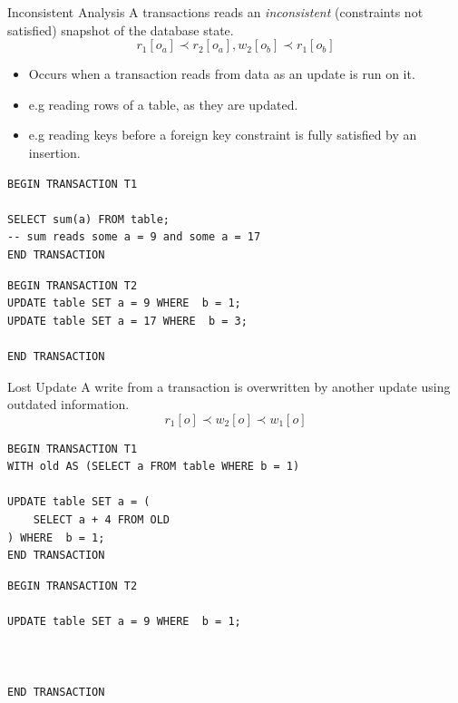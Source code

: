 \begin{definitionbox}{Inconsistent Analysis}
    A transactions reads an \textit{inconsistent} (constraints not satisfied) snapshot of the database state.
    \[r_1[o_a] \prec r_2[o_a],  w_2[o_b] \prec r_1[o_b]\]
    \begin{itemize}
        \item Occurs when a transaction reads from data as an update is run on it.
        \item e.g reading rows of a table, as they are updated.
        \item e.g reading keys before a foreign key constraint is fully satisfied by an insertion.
    \end{itemize}
    \tcblower
    \begin{minipage}[t]{.49\textwidth}
    \begin{verbatim}
BEGIN TRANSACTION T1

SELECT sum(a) FROM table;
-- sum reads some a = 9 and some a = 17
END TRANSACTION
       \end{verbatim}
   \end{minipage} \hfill \begin{minipage}[t]{.49\textwidth}
       \begin{verbatim}
BEGIN TRANSACTION T2
UPDATE table SET a = 9 WHERE  b = 1;
UPDATE table SET a = 17 WHERE  b = 3;

END TRANSACTION
       \end{verbatim}
   \end{minipage}
\end{definitionbox}

\begin{definitionbox}{Lost Update}
    A write from a transaction is overwritten by another update using outdated information.
    \[r_1[o] \prec w_2[o] \prec w_1[o]\]
    \tcblower
    \begin{minipage}[t]{.49\textwidth}
        \begin{verbatim}
BEGIN TRANSACTION T1
WITH old AS (SELECT a FROM table WHERE b = 1)

UPDATE table SET a = (
    SELECT a + 4 FROM OLD
) WHERE  b = 1;
END TRANSACTION
        \end{verbatim}
    \end{minipage} \hfill \begin{minipage}[t]{.49\textwidth}
        \begin{verbatim}
BEGIN TRANSACTION T2

UPDATE table SET a = 9 WHERE  b = 1;



END TRANSACTION
        \end{verbatim}
    \end{minipage}
\end{definitionbox}

